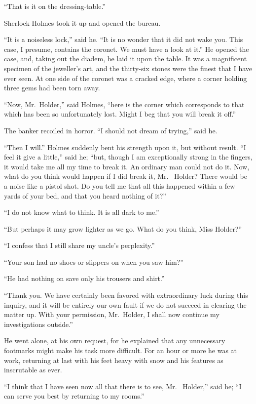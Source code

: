 “That is it on the dressing-table.”

Sherlock Holmes took it up and opened the bureau.

“It is a noiseless lock,” said he. “It is no wonder that it
did not wake you. This case, I presume, contains the coronet.
We must have a look at it.” He opened the case, and, taking
out the diadem, he laid it upon the table. It was a magnificent
specimen of the jeweller’s art, and the thirty-six stones
were the finest that I have ever seen. At one side of the
coronet was a cracked edge, where a corner holding three
gems had been torn away.

“Now, Mr.~Holder,” said Holmes, “here is the corner
which corresponds to that which has been so unfortunately
lost. Might I beg that you will break it off.”

The banker recoiled in horror. “I should not dream of
trying,” said he.

“Then I will.” Holmes suddenly bent his strength upon
it, but without result. “I feel it give a little,” said he; “but,
though I am exceptionally strong in the fingers, it would take
me all my time to break it. An ordinary man could not do it.
Now, what do you think would happen if I did break it, Mr.\ %
Holder? There would be a noise like a pistol shot. Do you
tell me that all this happened within a few yards of your bed,
and that you heard nothing of it?”

“I do not know what to think. It is all dark to me.”

“But perhaps it may grow lighter as we go. What do you
think, Miss Holder?”

“I confess that I still share my uncle’s perplexity.”

“Your son had no shoes or slippers on when you saw
him?”

“He had nothing on save only his trousers and shirt.”

“Thank you. We have certainly been favored with extraordinary
luck during this inquiry, and it will be entirely
our own fault if we do not succeed in clearing the matter up.
With your permission, Mr.~Holder, I shall now continue my
investigations outside.”

He went alone, at his own request, for he explained that
any unnecessary footmarks might make his task more difficult.
For an hour or more he was at work, returning at last
with his feet heavy with snow and his features as inscrutable
as ever.

“I think that I have seen now all that there is to see, Mr.\ %
Holder,” said he; “I can serve you best by returning to
my rooms.”

